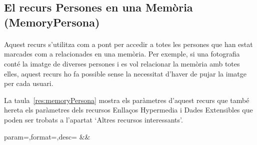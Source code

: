 \subsection{El recurs Persones en una Memòria (MemoryPersona)}

    \paragraph{}
    Aquest recurs s'utilitza com a pont per accedir a totes les persones que han estat marcades com a relacionades en una memòria. Per exemple, si una fotografia conté la imatge de diverses persones i es vol relacionar la memòria amb totes elles, aquest recurs ho fa possible sense la necessitat d'haver de pujar la imatge per cada usuari.

    La taula~\ref{res:memoryPersona} mostra els paràmetres d'aquest recurs que també hereta els paràmetres dels recursos Enllaços Hypermedia i Dades Extensibles que poden ser trobats a l'apartat `Altres recursos interessants'.

    \begin{center}
             {param=\param,format=\format,desc=\desc}
             {\param&\format&\desc}
     \end{center}
